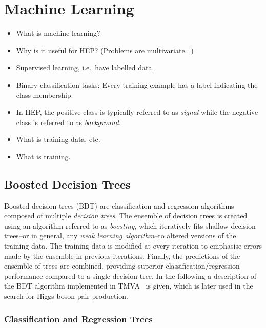 \section{Machine Learning}

\begin{itemize}
\item What is machine learning?

\item Why is it useful for HEP? (Problems are multivariate...)

\item Supervised learning, i.e.\ have labelled data.

\item Binary classification tasks: Every training example has a label indicating
  the class membership.

\item In HEP, the positive class is typically referred to as \emph{signal} while
  the negative class is referred to as \emph{background}.

\item What is training data, etc.

\item What is training.
\end{itemize}


\subsection{Boosted Decision Trees}

Boosted decision trees (BDT) are classification and regression algorithms
composed of multiple \emph{decision trees}. The ensemble of decision trees is
created using an algorithm referred to as \emph{boosting}, which iteratively
fits shallow decision trees--or in general, any \emph{weak learning
  algorithm}--to altered versions of the training data. The training data is
modified at every iteration to emphasise errors made by the ensemble in previous
iterations. Finally, the predictions of the ensemble of trees are combined,
providing superior classification/regression performance compared to a single
decision tree. In the following a description of the BDT algorithm implemented
in \textsc{TMVA}~\cite{TMVA} is given, which is later used in the search for
Higgs boson pair production.


\subsubsection{Classification and Regression Trees}

